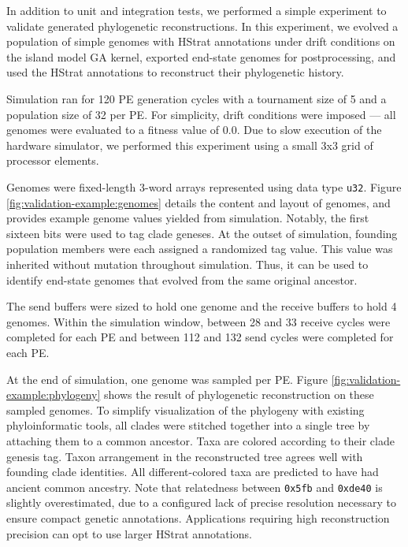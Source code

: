 In addition to unit and integration tests, we performed a simple experiment to validate generated phylogenetic reconstructions.
In this experiment, we evolved a population of simple genomes with HStrat annotations under drift conditions on the island model GA kernel, exported end-state genomes for postprocessing, and used the HStrat annotations to reconstruct their phylogenetic history.

Simulation ran for 120 PE generation cycles with a tournament size of 5 and a population size of 32 per PE.
For simplicity, drift conditions were imposed --- all genomes were evaluated to a fitness value of 0.0.
Due to slow execution of the hardware simulator, we performed this experiment using a small 3x3 grid of processor elements.

Genomes were fixed-length 3-word arrays represented using data type \texttt{u32}.
Figure \ref{fig:validation-example:genomes} details the content and layout of genomes, and provides example genome values yielded from simulation.
Notably, the first sixteen bits were used to tag clade geneses.
At the outset of simulation, founding population members were each assigned a randomized tag value.
This value was inherited without mutation throughout simulation.
Thus, it can be used to identify end-state genomes that evolved from the same original ancestor.

The send buffers were sized to hold one genome and the receive buffers to hold 4 genomes.
Within the simulation window, between 28 and 33 receive cycles were completed for each PE and between 112 and 132 send cycles were completed for each PE.



At the end of simulation, one genome was sampled per PE.
Figure \ref{fig:validation-example:phylogeny} shows the result of phylogenetic reconstruction on these sampled genomes.
To simplify visualization of the phylogeny with existing phyloinformatic tools, all clades were stitched together into a single tree by attaching them to a common ancestor.
Taxa are colored according to their clade genesis tag.
Taxon arrangement in the reconstructed tree agrees well with founding clade identities.
All different-colored taxa are predicted to have had ancient common ancestry.
Note that relatedness between \texttt{0x5fb} and \texttt{0xde40} is slightly overestimated, due to a configured lack of precise resolution necessary to ensure compact genetic annotations.
Applications requiring high reconstruction precision can opt to use larger HStrat annotations.

